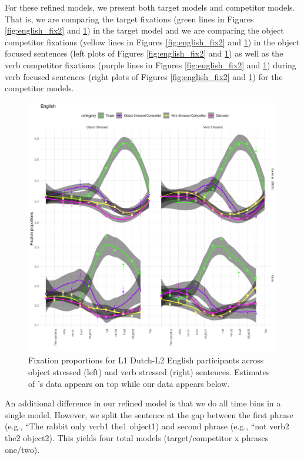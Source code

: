 For these refined models, we present both target models and competitor models. That is, we are comparing the target fixations (green lines in Figures \ref{fig:english_fix2} and \ref{fig:dutch_fix2}) in the target model and we are comparing the object competitor fixations (yellow lines in Figures \ref{fig:english_fix2} and \ref{fig:dutch_fix2}) in the object focused sentences (left plots of Figures \ref{fig:english_fix2} and \ref{fig:dutch_fix2}) as well as the verb competitor fixations (purple lines in Figures \ref{fig:english_fix2} and \ref{fig:dutch_fix2}) during verb focused sentences (right plots of Figures \ref{fig:english_fix2} and \ref{fig:dutch_fix2}) for the competitor models. 

\begin{figure}[H]  %
    \centering
    \includegraphics[width=\textwidth,height=\textheight,keepaspectratio]{viz/dutch_fix2.png}
    \caption{Fixation proportions for L1 Dutch-L2 English participants across object stressed (left) and verb stressed (right) sentences. Estimates of \cite{Ge2021}'s data appears on top while our data appears below.}
    \label{fig:dutch_fix2}
\end{figure}

An additional difference in our refined model is that we do all time bins in a single model. However, we split the sentence at the gap between the first phrase (e.g., ``The rabbit only verb1 the1 object1) and second phrase (e.g., ``not verb2 the2 object2). This yields four total models (target/competitor x phrases one/two). 


